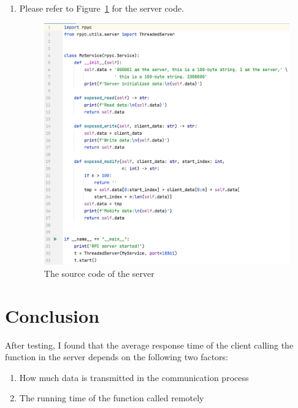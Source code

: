 \documentclass{article}
\begin{document}
\begin{enumerate}[label=(\alph*)]
{\begin{figure}[htp]
    \end{figure}
  }
  \item {
    Please refer to Figure~\ref{fig:server} for the server code.
    \begin{figure}[htp]
        \centering
        \includegraphics[width=15cm]{server}
        \caption{The source code of the server}
        \label{fig:server}
    \end{figure}
  }
\end{enumerate}


\section{Conclusion}\label{sec:conclusion}
After testing, I found that the average response time of the client calling the function in the server depends on the following two factors:
\begin{enumerate}[label=(\alph*)]
  \item How much data is transmitted in the communication process
  \item The running time of the function called remotely
\end{enumerate}
\end{document}
